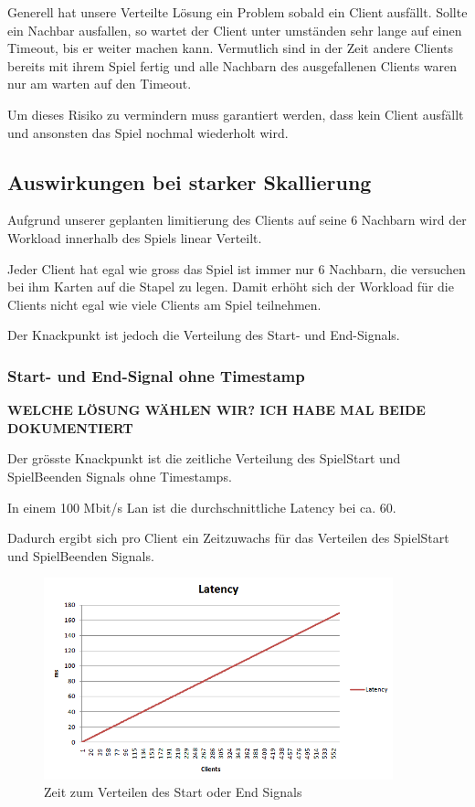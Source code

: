 Generell hat unsere Verteilte Lösung ein Problem sobald ein Client ausfällt. Sollte ein Nachbar ausfallen, so wartet der Client unter umständen sehr lange auf einen Timeout, bis er weiter machen kann. Vermutlich sind in der Zeit andere Clients bereits mit ihrem Spiel fertig und alle Nachbarn des ausgefallenen Clients waren nur am warten auf den Timeout.

Um dieses Risiko zu vermindern muss garantiert werden, dass kein Client ausfällt und ansonsten das Spiel nochmal wiederholt wird.



\subsection{Auswirkungen bei starker Skallierung}

Aufgrund unserer geplanten limitierung des Clients auf seine 6 Nachbarn wird der Workload innerhalb des Spiels linear Verteilt. 

Jeder Client hat egal wie gross das Spiel ist immer nur 6 Nachbarn, die versuchen bei ihm Karten auf die Stapel zu legen. Damit erhöht sich der Workload für die Clients nicht egal wie viele Clients am Spiel teilnehmen.

Der Knackpunkt ist jedoch die Verteilung des Start- und End-Signals.


\subsubsection{Start- und End-Signal ohne Timestamp}

\color{red}
\textbf{WELCHE LÖSUNG WÄHLEN WIR? ICH HABE MAL BEIDE DOKUMENTIERT}
\color{black}

Der grösste Knackpunkt ist die zeitliche Verteilung des SpielStart und SpielBeenden Signals ohne Timestamps.

In einem 100 Mbit/s Lan  ist die durchschnittliche Latency bei ca. \unit{60}{\micro\second}.

Dadurch ergibt sich pro Client ein Zeitzuwachs für das Verteilen des SpielStart und SpielBeenden Signals.

\begin{figure}[hbt]
  \centering
  \includegraphics[width=0.9\textwidth,angle=0]{graphics/latency.png}
  \caption{Zeit zum Verteilen des Start oder End Signals \hfill{} }
  \label{ergebnislatency}
 \end{figure}
 
